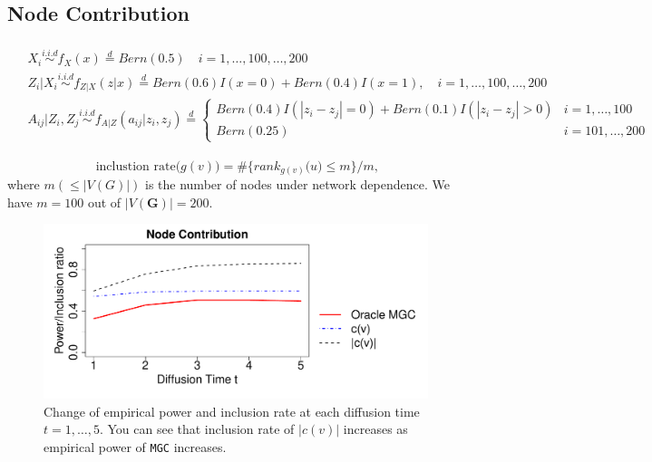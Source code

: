 \documentclass[12pt]{article}
\theoremstyle{definition}
\begin{document}
\subsection{Node Contribution}

\begin{equation}
\begin{gathered}
\begin{aligned}
& X_{i} \overset{i.i.d}{\sim} f_{X}(x)   \stackrel{d}{=}  Bern(0.5)  \quad i = 1, \ldots ,100, \ldots, 200 \\ & Z_{i} | X_{i}  \overset{i.i.d}{\sim}    f_{Z|X}(z|x)  \stackrel{d}{=}   Bern(0.6) I(x = 0) + Bern(0.4) I(x=1), \quad  i = 1,\ldots,100, \ldots, 200  \\
& A_{ij} | Z_{i}, Z_{j}   \overset{i.i.d}{\sim}   f_{A|Z}(a_{ij} | z_{i}, z_{j})  \stackrel{d}{=} \left\{  \begin{array}{cc} Bern(0.4) I(|z_{i} - z_{j}| = 0)  + Bern(0.1) I(|z_{i} - z_{j}| > 0) & i = 1,\ldots,100 \\   Bern(0.25)  & i=101, \ldots, 200  \end{array} \right.
\end{aligned}
\end{gathered}
\label{eq:contri}
\end{equation}


\begin{equation}
\mbox{ inclustion rate}\big(  g(v) \big) = \# \big\{  rank_{g(v)}\big(  u \big)  \leq  m  \big\}   /  m,
\label{eq:inclustion_rate}
\end{equation}
where $m (\leq |V(G)|)$ is the number of nodes under network dependence. We have $m=100$ out of $|V(\mathbf{G})| = 200$.
\begin{figure}[H]
	\centering
	\includegraphics[width=6in]{../Figure/binary_contribution.pdf}
	\caption{Change of empirical power and inclusion rate at each diffusion time $t=1,\ldots, 5$. You can see that inclusion rate of $|c(v)|$ increases as empirical power of \texttt{MGC} increases.}
	\label{fig:binary_contribution}
\end{figure}
\end{document}
